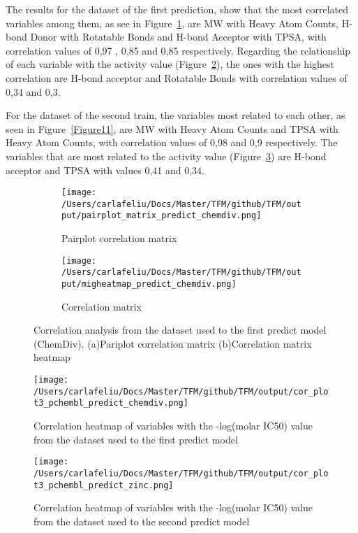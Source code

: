 \documentclass[final,times,twocolumn,article]{elsarticle}
\begin{document}
 The results for the dataset of the first prediction, show that the most correlated variables among them, as see in Figure~\ref{Figure8}, are MW with Heavy Atom Counts, H-bond Donor with Rotatable Bonds and H-bond Acceptor with TPSA, with correlation values of 0,97 , 0,85 and 0,85 respectively. Regarding the relationship of each variable with the activity value (Figure~\ref{Figure9}), the ones with the highest correlation are H-bond acceptor and Rotatable Bonds with correlation values of 0,34 and 0,3. 

 For the dataset of the second train, the variables most related to each other, as seen in Figure~\ref{Figure11}, are MW with Heavy Atom Counts and TPSA with Heavy Atom Counts, with correlation values of 0,98 and 0,9 respectively. The variables that are most related to the activity value (Figure~\ref{Figure10}) are H-bond acceptor and TPSA with values 0,41 and 0,34. 

\begin{figure}[h]
    \begin{subfigure}{0.5\textwidth}
        \texttt{[image: /Users/carlafeliu/Docs/Master/TFM/github/TFM/output/pairplot\_matrix\_predict\_chemdiv.png]} 
        \caption{Pairplot correlation matrix}
    \end{subfigure}
    \begin{subfigure}{0.5\textwidth}
        \texttt{[image: /Users/carlafeliu/Docs/Master/TFM/github/TFM/output/migheatmap\_predict\_chemdiv.png]}
        \caption{Correlation matrix}
    \end{subfigure}
    
    \caption{Correlation analysis from the dataset used to the first predict model (ChemDiv). (a)Pariplot correlation matrix (b)Correlation matrix heatmap}
    \label{Figure8}
\end{figure}

\begin{figure}[h]
    \centering 
     \texttt{[image: /Users/carlafeliu/Docs/Master/TFM/github/TFM/output/cor\_plot3\_pchembl\_predict\_chemdiv.png]}	
     \caption{Correlation heatmap of variables with the -log(molar IC50) value from the dataset used to the first predict model} 
     \label{Figure9}
 \end{figure}

 \begin{figure}[h]
    \centering 
     \texttt{[image: /Users/carlafeliu/Docs/Master/TFM/github/TFM/output/cor\_plot3\_pchembl\_predict\_zinc.png]}	
     \caption{Correlation heatmap of variables with the -log(molar IC50) value from the dataset used to the second predict model} 
     \label{Figure10}
 \end{figure}
\end{document}

